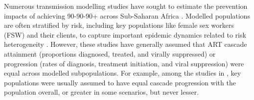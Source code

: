 \par
Numerous transmission modelling studies have sought to estimate
the prevention impacts of achieving 90-90-90+ across Sub-Saharan Africa \cite{Knight2022sr}.
Modelled populations are often stratified by risk,
including key populations like female sex workers (FSW) and their clients,
to capture important epidemic dynamics related to risk heterogeneity \cite{Watts2010}.
However, these studies have generally assumed that ART cascade
attainment (\ie proportions diagnosed, treated, and virally suppressed) or
progression (\ie rates of diagnosis, treatment initiation, and viral suppression)
were equal across modelled subpopulations.
For example, among the studies in \cite{Knight2022sr},
key populations were usually assumed to have
equal cascade progression with the population overall,
or greater in some scenarios, but never lesser.
